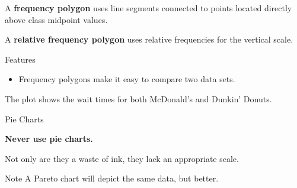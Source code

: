\documentclass{beamer}
\begin{document}
\begin{frame}
\begin{definition}
A \textbf{frequency polygon} uses line segments connected to points located directly above class midpoint values.
\end{definition}\pause

\begin{definition}
A \textbf{relative frequency polygon} uses relative frequencies for the vertical scale.
\end{definition}\pause

\begin{block}{Features}
\begin{itemize}
\item Frequency polygons make it easy to compare two data sets.
\end{itemize}
\end{block}
\end{frame}

\begin{frame}
\begin{example}
The plot shows the wait times for both McDonald's and Dunkin' Donuts.
\begin{center}
\end{center}
\end{example}
\end{frame}

\begin{frame}
\begin{block}{Pie Charts}
\vspace{4mm}
\begin{center}
\textbf{\LARGE
Never use pie charts.}
\end{center}

\vspace{0mm}
Not only are they a waste of ink, they lack an appropriate scale.
\end{block}\pause

\begin{block}{Note}
A Pareto chart will depict the same data, but better.
\end{block}
\end{frame}
\end{document}
